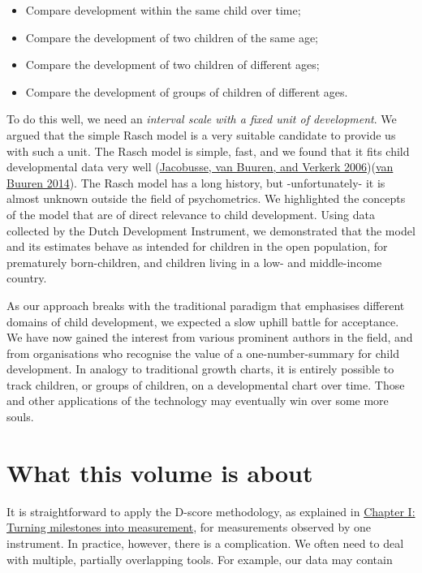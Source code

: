 \documentclass[
]{book}
\providecommand{\tightlist}{%
  \setlength{\itemsep}{0pt}\setlength{\parskip}{0pt}}
\begin{document}
\begin{itemize}
\tightlist
\item
  Compare development within the same child over time;
\item
  Compare the development of two children of the same age;
\item
  Compare the development of two children of different ages;
\item
  Compare the development of groups of children of different ages.
\end{itemize}

To do this well, we need an \emph{interval scale with a fixed unit of development}. We argued that the simple Rasch model is a very suitable candidate to provide us with such a unit. The Rasch model is simple, fast, and we found that it fits child developmental data very well (\protect\hyperlink{ref-jacobusse2006}{Jacobusse, van Buuren, and Verkerk 2006})(\protect\hyperlink{ref-vanbuuren2014}{van Buuren 2014}). The Rasch model has a long history, but -unfortunately- it is almost unknown outside the field of psychometrics. We highlighted the concepts of the model that are of direct relevance to child development. Using data collected by the Dutch Development Instrument, we demonstrated that the model and its estimates behave as intended for children in the open population, for prematurely born-children, and children living in a low- and middle-income country.

As our approach breaks with the traditional paradigm that emphasises different domains of child development, we expected a slow uphill battle for acceptance. We have now gained the interest from various prominent authors in the field, and from organisations who recognise the value of a one-number-summary for child development. In analogy to traditional growth charts, it is entirely possible to track children, or groups of children, on a developmental chart over time. Those and other applications of the technology may eventually win over some more souls.

\hypertarget{sec:thisvolume}{%
\section{What this volume is about}\label{sec:thisvolume}}

It is straightforward to apply the D-score methodology, as explained in \href{https://d-score.org/dbook1}{Chapter I: Turning milestones into measurement}, for measurements observed by one instrument. In practice, however, there is a complication. We often need to deal with multiple, partially overlapping tools. For example, our data may contain
\end{document}
